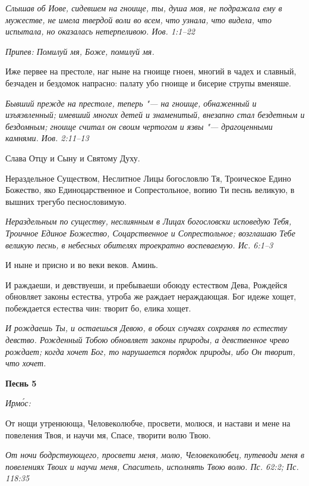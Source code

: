 \itshape Слышав об Иове, сидевшем на гноище, ты, душа моя, не подражала ему в мужестве, не имела твердой воли во всем, что узнала, что видела, что испытала, но оказалась нетерпеливою. Иов. 1:1–22\normalfont{}


\itshape Припев:\normalfont{} Помилуй мя, Боже, помилуй мя.


Иже первее на престоле, наг ныне на гноище гноен, многий в чадех и славный, безчаден и бездомок напрасно: палату убо гноище и бисерие струпы вменяше.


\itshape Бывший прежде на престоле, теперь "--- на гноище, обнаженный и изъязвленный; имевший многих детей и знаменитый, внезапно стал бездетным и бездомным; гноище считал он своим чертогом и язвы "--- драгоценными камнями. Иов. 2:11–13\normalfont{}


Слава Отцу и Сыну и Святому Духу.


Нераздельное Существом, Неслитное Лицы богословлю Тя, Троическое Едино Божество, яко Единоцарственное и Сопрестольное, вопию Ти песнь великую, в вышних трегубо песнословимую.


\itshape Нераздельным по существу, неслиянным в Лицах богословски исповедую Тебя, Троичное Единое Божество, Соцарственное и Сопрестольное; возглашаю Тебе великую песнь, в небесных обителях троекратно воспеваемую. Ис. 6:1–3\normalfont{}


И ныне и присно и во веки веков. Аминь.


И раждаеши, и девствуеши, и пребываеши обоюду естеством Дева, Рождейся обновляет законы естества, утроба же раждает нераждающая. Бог идеже хощет, побеждается естества чин: творит бо, елика хощет.


\itshape И рождаешь Ты, и остаешься Девою, в обоих случаях сохраняя по естеству девство. Рожденный Тобою обновляет законы природы, а девственное чрево рождает; когда хочет Бог, то нарушается порядок природы, ибо Он творит, что хочет.\normalfont{}





\bfseries Песнь 5\normalfont{}


\itshape Ирмо́с:\normalfont{}


От нощи утренююща, Человеколюбче, просвети, молюся, и настави и мене на повеления Твоя, и научи мя, Спасе, творити волю Твою.


\itshape От ночи бодрствующего, просвети меня, молю, Человеколюбец, путеводи меня в повелениях Твоих и научи меня, Спаситель, исполнять Твою волю. Пс. 62:2; Пс. 118:35\normalfont{}


